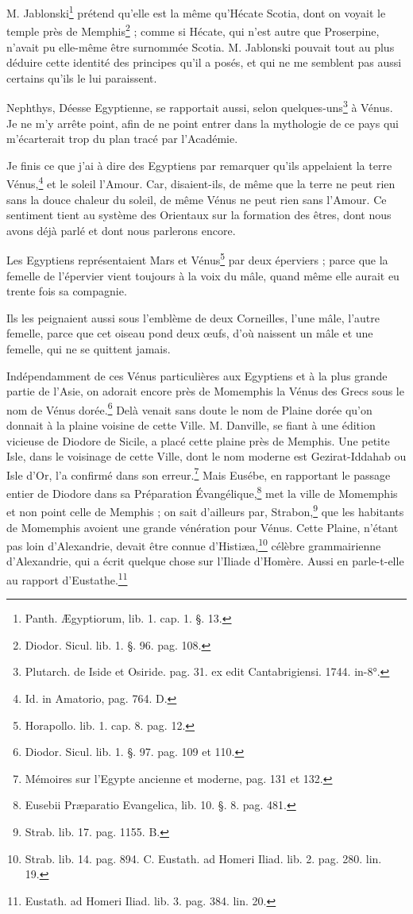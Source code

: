 \documentclass[a4paper, 11pt, oneside, polutonikogreek, french]{article}
\begin{document}
M. Jablonski\footnote{Panth. Ægyptiorum, lib. 1. cap. 1. §. 13.} prétend qu'elle est la même qu'Hécate Scotia, dont on voyait le temple près de Memphis\footnote{Diodor. Sicul. lib. 1. §. 96. pag. 108.} ; comme si Hécate, qui n'est autre que Proserpine, n'avait pu elle-même être surnommée Scotia. M. Jablonski pouvait tout au plus déduire cette identité des principes qu'il a posés, et qui ne me semblent pas aussi certains qu'ils le lui paraissent.

Nephthys, Déesse Egyptienne, se rapportait aussi, selon quelques-uns\footnote{Plutarch. de Iside et Osiride. pag. 31. ex edit Cantabrigiensi. 1744. in-8°.} à Vénus. Je ne m'y arrête point, afin de ne point entrer dans la mythologie de ce pays qui m'écarterait trop du plan tracé par l'Académie.

Je finis ce que j'ai à dire des Egyptiens par remarquer qu'ils appelaient la terre Vénus,\footnote{Id. in Amatorio, pag. 764. D.} et le soleil l'Amour. Car, disaient-ils, de même que la terre ne peut rien sans la douce chaleur du soleil, de même Vénus ne peut rien sans l'Amour. Ce sentiment tient au système des Orientaux sur la formation des êtres, dont nous avons déjà parlé et dont nous parlerons encore.

Les Egyptiens représentaient Mars et Vénus\footnote{Horapollo. lib. 1. cap. 8. pag. 12.} par deux éperviers ; parce que la femelle de l'épervier vient toujours à la voix du mâle, quand même elle aurait eu trente fois sa compagnie.

Ils les peignaient aussi sous l'emblème de deux Corneilles, l'une mâle, l'autre femelle, parce que cet oiseau pond deux œufs, d'où naissent un mâle et une femelle, qui ne se quittent jamais.

Indépendamment de ces Vénus particulières aux Egyptiens et à la plus grande partie de l'Asie, on adorait encore près de Momemphis la Vénus des Grecs sous le nom de Vénus dorée.\footnote{Diodor. Sicul. lib. 1. §. 97. pag. 109 et 110.} Delà venait sans doute le nom de Plaine dorée qu'on donnait à la plaine voisine de cette Ville. M. Danville, se fiant à une édition vicieuse de Diodore de Sicile, a placé cette plaine près de Memphis. Une petite Isle, dans le voisinage de cette Ville, dont le nom moderne est Gezirat-Iddahab ou Isle d'Or, l'a confirmé dans son erreur.\footnote{Mémoires sur l'Egypte ancienne et moderne, pag. 131 et 132.} Mais Eusébe, en rapportant le passage entier de Diodore dans sa Préparation Évangélique,\footnote{Eusebii Præparatio Evangelica, lib. 10. §. 8. pag. 481.} met la ville de Momemphis et non point celle de Memphis ; on sait d'ailleurs par, Strabon,\footnote{Strab. lib. 17. pag. 1155. B.} que les habitants de Momemphis avoient une grande vénération pour Vénus. Cette Plaine, n'étant pas loin d'Alexandrie, devait être connue d'Histiæa,\footnote{Strab. lib. 14. pag. 894. C. Eustath. ad Homeri Iliad. lib. 2. pag. 280. lin. 19.} célèbre grammairienne d'Alexandrie, qui a écrit quelque chose sur l'Iliade d'Homère. Aussi en parle-t-elle au rapport d'Eustathe.\footnote{Eustath. ad Homeri Iliad. lib. 3. pag. 384. lin. 20.}
\end{document}
